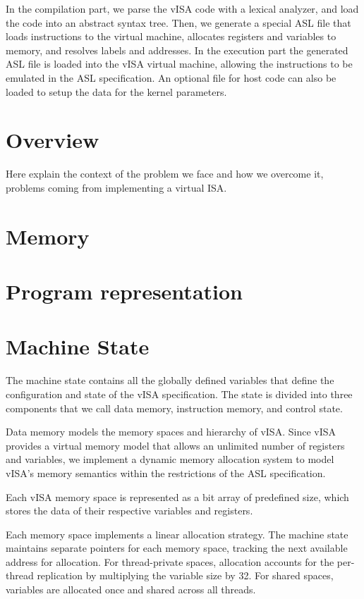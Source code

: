 In the compilation part, we parse the vISA code with a lexical analyzer, and
load the code into an abstract syntax tree. Then, we generate a special ASL
file that loads instructions to the virtual machine, allocates registers and
variables to memory, and resolves labels and addresses. In the execution part
the generated ASL file is loaded into the vISA virtual machine, allowing the
instructions to be emulated in the ASL specification. An optional file for host
code can also be loaded to setup the data for the kernel parameters.

\section{Overview}
Here explain the context of the problem we face and how we overcome it,
problems coming from implementing a virtual ISA.

\section{Memory}
\section{Program representation}

\section{Machine State}

The machine state contains all the globally defined variables that define the
configuration and state of the vISA specification. The state is divided into
three components that we call data memory, instruction memory, and control
state.

Data memory models the memory spaces and hierarchy of vISA. Since vISA provides
a virtual memory model that allows an unlimited number of registers and
variables, we implement a dynamic memory allocation system to model vISA's
memory semantics within the restrictions of the ASL specification.

Each vISA memory space is represented as a bit array of predefined size, which
stores the data of their respective variables and registers.

Each memory space implements a linear allocation strategy. The machine state
maintains separate pointers for each memory space, tracking the next available
address for allocation. For thread-private spaces, allocation accounts for the
per-thread replication by multiplying the variable size by 32. For shared
spaces, variables are allocated once and shared across all threads.

